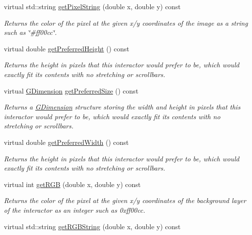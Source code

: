 \begin{DoxyCompactItemize}
virtual std\+::string \mbox{\hyperlink{classGDrawingSurface_a8da04ef488ec5fa498fbbffaf50928fd}{get\+Pixel\+String}} (double x, double y) const
\begin{DoxyCompactList}\small\item\em Returns the color of the pixel at the given x/y coordinates of the image as a string such as \char`\"{}\#ff00cc\char`\"{}. \end{DoxyCompactList}\item 
virtual double \mbox{\hyperlink{classGInteractor_a747de0961653847bdc6615dbf756d715}{get\+Preferred\+Height}} () const
\begin{DoxyCompactList}\small\item\em Returns the height in pixels that this interactor would prefer to be, which would exactly fit its contents with no stretching or scrollbars. \end{DoxyCompactList}\item 
virtual \mbox{\hyperlink{classGDimension}{G\+Dimension}} \mbox{\hyperlink{classGInteractor_a4aabbee761d8e9116275401131b7ccd1}{get\+Preferred\+Size}} () const
\begin{DoxyCompactList}\small\item\em Returns a \mbox{\hyperlink{classGDimension}{G\+Dimension}} structure storing the width and height in pixels that this interactor would prefer to be, which would exactly fit its contents with no stretching or scrollbars. \end{DoxyCompactList}\item 
virtual double \mbox{\hyperlink{classGInteractor_a82bca31d37700fb0e35d2743352efd5e}{get\+Preferred\+Width}} () const
\begin{DoxyCompactList}\small\item\em Returns the height in pixels that this interactor would prefer to be, which would exactly fit its contents with no stretching or scrollbars. \end{DoxyCompactList}\item 
virtual int \mbox{\hyperlink{classGDrawingSurface_a9e983467cf0c97cfd62433a8471570dc}{get\+R\+GB}} (double x, double y) const
\begin{DoxyCompactList}\small\item\em Returns the color of the pixel at the given x/y coordinates of the background layer of the interactor as an integer such as 0xff00cc. \end{DoxyCompactList}\item 
virtual std\+::string \mbox{\hyperlink{classGDrawingSurface_a456d3582acc3544f37d939f5cb8802fe}{get\+R\+G\+B\+String}} (double x, double y) const

\end{DoxyCompactItemize}
